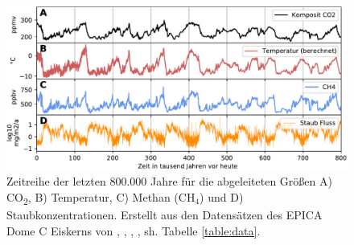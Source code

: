 \documentclass[12pt,a4paper,onecolumn,headheight=30pt]{scrartcl}
\newcommand{\cotwo}{CO\textsubscript{2}}
\begin{document}
\begin{figure}[htbp]
\centering
\includegraphics[width=\textwidth]{bilder/epica_icecore.pdf}
\caption{Zeitreihe der letzten 800.000 Jahre für die abgeleiteten Größen A) \cotwo, B) Temperatur, C) Methan (CH$_4$) und D) Staubkonzentrationen. Erstellt aus den Datensätzen des EPICA Dome C Eiskerns von \cite{Jouzel.2007}, \cite{Lambert.2012}, \cite{Loulergue.2008}, \cite{Bereiter.2015}, sh. Tabelle \ref{table:data}.}   \label{fig:icecore}
\end{figure}
\end{document}
